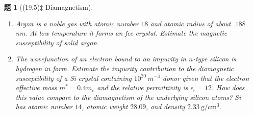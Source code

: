 \documentclass[UTF8,10pt,a4paper]{article}
\theoremstyle{Problem}
\newtheorem{prob}{题}
\theoremstyle{Solution}
\begin{document}
\begin{prob}[(19.5)$\ddagger$ Diamagnetism]
    \begin{enumerate}
        \item[(a)] Argon is a noble gas with atomic number $18$ and atomic radius of about $.188$ nm. At low temperature it forms an fcc crystal. Estimate the magnetic susceptibility of solid argon.
        \item[(b)] The wavefunction of an electron bound to an impurity in $n$-type silicon is hydrogen in form. Estimate the impurity contribution to the diamagnetic susceptibility of a Si crystal containing $10^{20}~m^{-3}$ donor given that the electron effective mass $m^*=0.4m_e$ and the relative permittivity is $\epsilon_r=12$. How does this value compare to the diamagnetism of the underlying silicon atoms? Si has atomic number $14$, atomic weight $28.09$, and density $2.33~\text{g}/\text{cm}^3$.
    \end{enumerate}
\end{prob}
\end{document}
